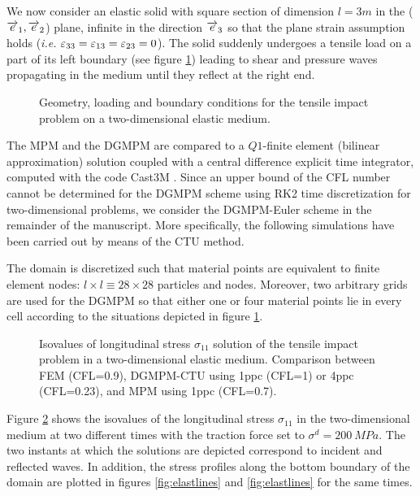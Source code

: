 We now consider an elastic solid with square section of dimension $l=3m$ in the (${\overrightarrow{e}}_1,{\overrightarrow{e}}_2$) plane, infinite in the direction ${\overrightarrow{e}}_3$ so that the plane strain assumption holds (\textit{i.e. $\varepsilon_{33}=\varepsilon_{13}=\varepsilon_{23}=0$}). The solid suddenly undergoes a tensile load on a part of its left boundary (see figure \ref{fig:2D_planeStrain}) leading to shear and pressure waves propagating in the medium until they reflect at the right end.
\begin{figure}[h!]
  \centering
   \qquad
  \caption{Geometry, loading and boundary conditions for the tensile impact problem on a two-dimensional elastic medium.}
  \label{fig:2D_planeStrain}
\end{figure}
The MPM and the DGMPM are compared to a $Q1$-finite element (bilinear approximation) solution coupled with a central difference explicit time integrator, computed with the code Cast3M \cite{Castem}.
Since an upper bound of the CFL number cannot be determined for the DGMPM scheme using RK2 time discretization for two-dimensional problems, we consider the DGMPM-Euler scheme in the remainder of the manuscript.
More specifically, the following simulations have been carried out by means of the CTU method.

The domain is discretized such that material points are equivalent to finite element nodes: $l\times l \equiv 28 \times 28$ particles and nodes.
Moreover, two arbitrary grids are used for the DGMPM so that either one or four material points lie in every cell according to the situations depicted in figure \ref{fig:2D_planeStrain}.
\begin{figure}[h!]
  \centering
  
  \caption{Isovalues of longitudinal stress $\sigma_{11}$ solution of the tensile impact problem in a two-dimensional elastic medium. Comparison between FEM (CFL=0.9), DGMPM-CTU using 1ppc (CFL=1) or 4ppc (CFL=0.23), and MPM using 1ppc (CFL=0.7).}
  \label{fig:2delast_comparison}
\end{figure}
Figure \ref{fig:2delast_comparison} shows the isovalues of the longitudinal stress $\sigma_{11}$ in the two-dimensional medium at two different times with the traction force set to $\sigma^d=200\: MPa$.
The two instants at which the solutions are depicted correspond to incident and reflected waves. In addition, the stress profiles along the bottom boundary of the domain are plotted in figures \ref{fig:elastlines} and \ref{fig:elastlines} for the same times.

